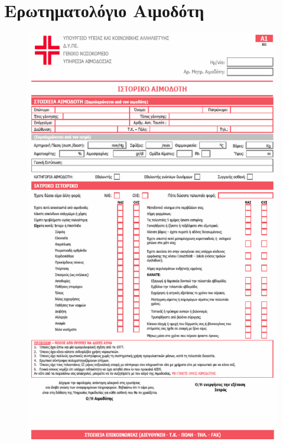 \graphicspath{ {Figures/appendix/} }
\chapter{Ερωτηματολόγιο Αιμοδότη}\label{Donor Questionnaire}
\newpage
	\begin{figure}[H]
	    \centering
	    \includegraphics[width=1\textwidth]{donor_questionnaire.png}
	\end{figure}

